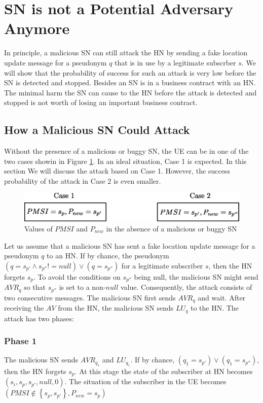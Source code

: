 \documentclass{llncs} %
\begin{document}
\section{SN is not a Potential Adversary Anymore}
In principle, a malicious SN can still attack the HN by sending a fake location update message for a pseudonym $q$ that is in use by a legitimate subscrber $s$. We will show that the probability of success for such an attack is very low before the SN is detected and stopped. Besides an SN is in a business contract with an HN. The minimal harm the SN can cause to the HN before the attack is detected and stopped is not worth of losing an important business contract. 

\subsection{How a Malicious SN Could Attack} \label{sec:attack_by_sn}
Without the presence of a malicious or buggy SN, the UE can be in one of the two cases showin in Figure \ref{fig:ue_cases}. In an ideal situation, Case 1 is expected. In this section We will discuss the attack based on Case 1. However, the success probability of the attack in Case 2 is even smaller.


\begin{figure}[]
  \centering
    \includegraphics[width=\textwidth]{UE_cases.eps}
  \caption{Values of $PMSI$ and $P_{new}$ in the absence of a malicious or buggy SN}
  \label{fig:ue_cases}	
\end{figure}


Let us assume that a malicious SN has sent a fake location update message for a pseudonym $q$ to an HN. If by chance, the pseudonym $\left(q = s_{p'} \land s_{p''}! = null\right) \vee \left( q = s_{p''}\right)$ for a legitimate subscriber $s$, then the HN forgets $s_p$. To avoid the conditions on $s_{p''}$ being null, the malicious SN might send $AVR_{q}$ so that $s_{p''}$ is set to a non-$null$ value. Consequently, the attack consists of two consecutive messages. The malicious SN first sends $AVR_q$ and wait. After receiving the $AV$ from the HN, the malicious SN sends $LU_{q}$ to the HN. The attack has two phases: 

\subsubsection{Phase 1}  The malicious SN sends $AVR_{q_1}$ and $LU_{q_1}$. If by chance, $\left(q_1 = s_{p'} \right) \vee \left(q_1 = s_{p''}\right)$, then the HN forgets $s_p$. At this stage the state of the subscriber at HN becomes $(s_i,s_p,s_{p'},null,0)$. The situation of the subscriber in the UE becomes $\left(PMSI \notin \left\lbrace s_p,s_{p'} \right\rbrace, P_{new} = s_{p} \right)$
\end{document}
